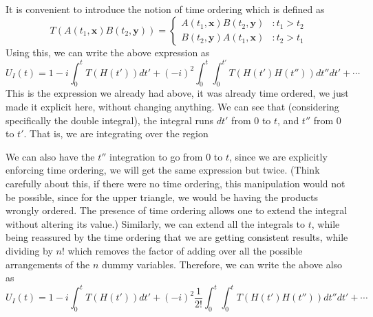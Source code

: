 \documentclass[11pt]{article}
\numberwithin{equation}{section}
\begin{document}
    It is convenient to introduce the notion of time ordering which is defined as 
    \begin{equation*}
        T(A(t_1, \textbf{x})B(t_2, \textbf{y})) = \begin{cases}
            A(t_1, \textbf{x})B(t_2, \textbf{y}) &: t_1 > t_2\\
            B(t_2, \textbf{y})A(t_1, \textbf{x}) &: t_2 > t_1
        \end{cases}
    \end{equation*}
    Using this, we can write the above expression as 
    \begin{equation*}
        U_I(t) = 1 - i\int_0^t T(H(t')) dt' + (-i)^2 \int_0^t \int_0^{t'} T(H(t')H(t''))dt''dt' + \cdots
    \end{equation*}
    This is the expression we already had above, it was already time ordered, we just made it explicit here, without changing anything. We can see that (considering specifically the double integral), the integral runs \(dt'\) from \(0\) to \(t\), and \(t''\) from \(0\) to \(t'\). That is, we are integrating over the region 
    \begin{figure}[h]
        \centering
    \end{figure}

    We can also have the \(t''\) integration to go from \(0\) to \(t\), since we are explicitly enforcing time ordering, we will get the same expression but twice. (Think carefully about this, if there were no time ordering, this manipulation would not be possible, since for the upper triangle, we would be having the products wrongly ordered. The presence of time ordering allows one to extend the integral without altering its value.) Similarly, we can extend all the integrals to \(t\), while being reassured by the time ordering that we are getting consistent results, while dividing by \(n!\) which removes the factor of adding over all the possible arrangements of the \(n\) dummy variables. Therefore, we can write the above also as 
    \begin{equation*}
        U_I(t) = 1 - i\int_0^t T(H(t')) dt' + (-i)^2 \frac{1}{2!}\int_0^t \int_0^t T(H(t')H(t''))dt''dt' + \cdots
    \end{equation*}
\end{document}
